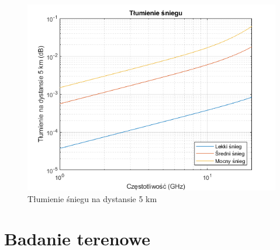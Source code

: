 \begin{figure}[h]
	\label{fig4}
	\includegraphics{./grafika/num_sim4_tlumienie_podczas_opadu_sniegu_5km.png}
	\caption{Tłumienie śniegu na dystansie 5 km}
\end{figure}


\section{Badanie terenowe}